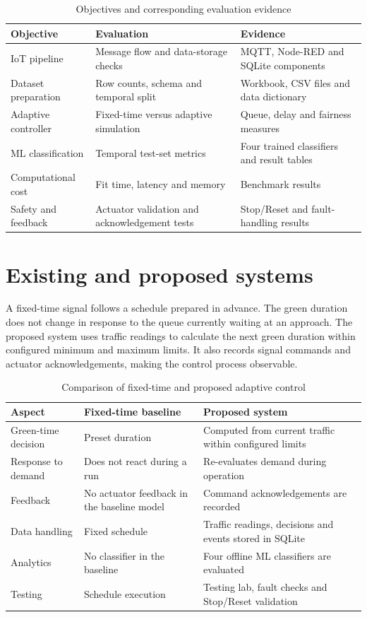 \documentclass[12pt,a4paper,oneside]{report}
\begin{document}
\begin{table}[htbp]\centering\small
\caption{Objectives and corresponding evaluation evidence}\label{tab:objective-map}
\begin{tabular}{|p{}|p{}|p{}|}\hline
\textbf{Objective} & \textbf{Evaluation} & \textbf{Evidence} \\\hline
IoT pipeline & Message flow and data-storage checks & MQTT, Node-RED and SQLite components \\\hline
Dataset preparation & Row counts, schema and temporal split & Workbook, CSV files and data dictionary \\\hline
Adaptive controller & Fixed-time versus adaptive simulation & Queue, delay and fairness measures \\\hline
ML classification & Temporal test-set metrics & Four trained classifiers and result tables \\\hline
Computational cost & Fit time, latency and memory & Benchmark results \\\hline
Safety and feedback & Actuator validation and acknowledgement tests & Stop/Reset and fault-handling results \\\hline
\end{tabular}\end{table}

\section{Existing and proposed systems}
A fixed-time signal follows a schedule prepared in advance. The green duration does not change in response to the queue currently waiting at an approach. The proposed system uses traffic readings to calculate the next green duration within configured minimum and maximum limits. It also records signal commands and actuator acknowledgements, making the control process observable.

\begin{table}[htbp]\centering\small
\caption{Comparison of fixed-time and proposed adaptive control}\label{tab:exist-vs-proposed}
\begin{tabular}{|p{}|p{}|p{}|}\hline
\textbf{Aspect} & \textbf{Fixed-time baseline} & \textbf{Proposed system} \\\hline
Green-time decision & Preset duration & Computed from current traffic within configured limits \\\hline
Response to demand & Does not react during a run & Re-evaluates demand during operation \\\hline
Feedback & No actuator feedback in the baseline model & Command acknowledgements are recorded \\\hline
Data handling & Fixed schedule & Traffic readings, decisions and events stored in SQLite \\\hline
Analytics & No classifier in the baseline & Four offline ML classifiers are evaluated \\\hline
Testing & Schedule execution & Testing lab, fault checks and Stop/Reset validation \\\hline
\end{tabular}\end{table}
\end{document}
